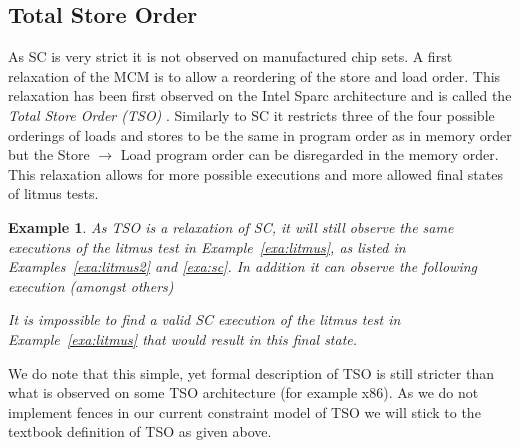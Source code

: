 \documentclass[runningheads]{llncs}
\newtheorem{exa}{Example}
\begin{document}
\subsection{Total Store Order}
\label{sec:tso}
As SC is very strict it is not observed on manufactured chip sets.
A first relaxation of the MCM is to allow a reordering of the store and load order.
This relaxation has been first observed on the Intel Sparc architecture and is called the \emph{Total Store Order (TSO)} \cite{sparc1994}.
Similarly to SC it restricts three of the four possible orderings of loads and stores to be the same in program order as in memory order but the Store $\rightarrow$ Load program order can be disregarded in the memory order.
This relaxation allows for more possible executions and more allowed final states of litmus tests.

\begin{exa}
\label{exa:tso}
As TSO is a relaxation of SC, it will still observe the same executions of the litmus test in Example~\ref{exa:litmus}, as listed in Examples~\ref{exa:litmus2} and \ref{exa:sc}.
In addition it can observe the following execution (amongst others)
\begin{table}[H]
\begin{center}
{}
\end{center}
\end{table}
\vspace{-1cm}

It is impossible to find a valid SC execution of the litmus test in Example~\ref{exa:litmus} that would result in this final state.
\end{exa}


We do note that this simple, yet formal description of TSO is still stricter than what is observed on some TSO architecture (for example x86).
As we do not implement fences in our current constraint model of TSO we will stick to the textbook definition of TSO as given above.
\end{document}
